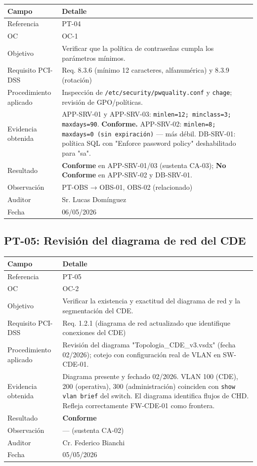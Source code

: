 \documentclass[11pt,a4paper]{article}
\begin{document}
\begin{tabularx}{\textwidth}{P{5cm}L}
\toprule
\textbf{Campo} & \textbf{Detalle} \\
\midrule
Referencia & PT-04 \\
OC & OC-1 \\
Objetivo & Verificar que la política de contraseñas cumpla los parámetros mínimos. \\
Requisito PCI-DSS & Req. 8.3.6 (mínimo 12 caracteres, alfanumérica) y 8.3.9 (rotación) \\
Procedimiento aplicado & Inspección de \texttt{/etc/security/pwquality.conf} y \texttt{chage}; revisión de GPO/políticas. \\
Evidencia obtenida & APP-SRV-01 y APP-SRV-03: \texttt{minlen=12; minclass=3; maxdays=90}. \textbf{Conforme.} APP-SRV-02: \texttt{minlen=8; maxdays=0 (sin expiración)} — más débil. DB-SRV-01: política SQL con "Enforce password policy" deshabilitado para "sa". \\
Resultado & \textbf{Conforme} en APP-SRV-01/03 (sustenta CA-03); \textbf{No Conforme} en APP-SRV-02 y DB-SRV-01. \\
Observación & PT-OBS → OBS-01, OBS-02 (relacionado) \\
Auditor & Sr. Lucas Domínguez \\
Fecha & 06/05/2026 \\
\bottomrule
\end{tabularx}

\subsection{PT-05: Revisión del diagrama de red del CDE}

\begin{tabularx}{\textwidth}{P{5cm}L}
\toprule
\textbf{Campo} & \textbf{Detalle} \\
\midrule
Referencia & PT-05 \\
OC & OC-2 \\
Objetivo & Verificar la existencia y exactitud del diagrama de red y la segmentación del CDE. \\
Requisito PCI-DSS & Req. 1.2.1 (diagrama de red actualizado que identifique conexiones del CDE) \\
Procedimiento aplicado & Revisión del diagrama "Topologia_CDE_v3.vsdx" (fecha 02/2026); cotejo con configuración real de VLAN en SW-CDE-01. \\
Evidencia obtenida & Diagrama presente y fechado 02/2026. VLAN 100 (CDE), 200 (operativa), 300 (administración) coinciden con \texttt{show vlan brief} del switch. El diagrama identifica flujos de CHD. Refleja correctamente FW-CDE-01 como frontera. \\
Resultado & \textbf{Conforme} \\
Observación & — (sustenta CA-02) \\
Auditor & Cr. Federico Bianchi \\
Fecha & 05/05/2026 \\
\bottomrule
\end{tabularx}
\end{document}
